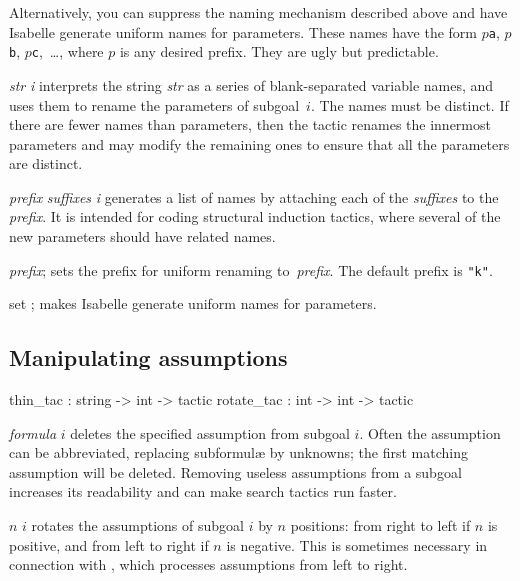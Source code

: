Alternatively, you can suppress the naming mechanism described above and
have Isabelle generate uniform names for parameters.  These names have the
form $p${\tt a}, $p${\tt b}, $p${\tt c},~\ldots, where $p$ is any desired
prefix.  They are ugly but predictable.

\begin{ttdescription}
\item[\ttindexbold{rename_tac} {\it str} {\it i}] 
interprets the string {\it str} as a series of blank-separated variable
names, and uses them to rename the parameters of subgoal~$i$.  The names
must be distinct.  If there are fewer names than parameters, then the
tactic renames the innermost parameters and may modify the remaining ones
to ensure that all the parameters are distinct.

\item[\ttindexbold{rename_last_tac} {\it prefix} {\it suffixes} {\it i}] 
generates a list of names by attaching each of the {\it suffixes\/} to the 
{\it prefix}.  It is intended for coding structural induction tactics,
where several of the new parameters should have related names.

\item[\ttindexbold{Logic.set_rename_prefix} {\it prefix};] 
sets the prefix for uniform renaming to~{\it prefix}.  The default prefix
is {\tt"k"}.

\item[set \ttindexbold{Logic.auto_rename};] 
makes Isabelle generate uniform names for parameters. 
\end{ttdescription}


\subsection{Manipulating assumptions}
\begin{ttbox} 
thin_tac   : string -> int -> tactic
rotate_tac : int -> int -> tactic
\end{ttbox}
\begin{ttdescription}
\item[\ttindexbold{thin_tac} {\it formula} $i$]  
deletes the specified assumption from subgoal $i$.  Often the assumption
can be abbreviated, replacing subformul{\ae} by unknowns; the first matching
assumption will be deleted.  Removing useless assumptions from a subgoal
increases its readability and can make search tactics run faster.

\item[\ttindexbold{rotate_tac} $n$ $i$]  
rotates the assumptions of subgoal $i$ by $n$ positions: from right to left
if $n$ is positive, and from left to right if $n$ is negative.  This is 
sometimes necessary in connection with , which 
processes assumptions from left to right.
\end{ttdescription}


